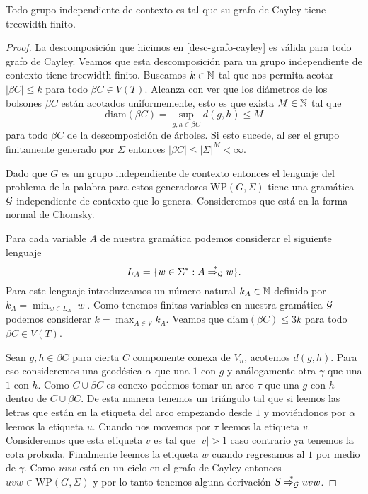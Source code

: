 \documentclass[tesis.tex]{subfiles}
\newcommand{\WP}{\text{WP}(G, \Sigma)}
\newcommand{\deriva}{\overset{*}{\Rightarrow_{\cal G}}}
\begin{document}
\medskip
\begin{teo}
	Todo grupo independiente de contexto es tal que su grafo de Cayley tiene treewidth finito.
\end{teo}
\begin{proof}

La descomposición que hicimos en \ref{desc-grafo-cayley} es válida para todo grafo de Cayley. 
Veamos que esta descomposición para un grupo independiente de contexto tiene treewidth finito. 
Buscamos $k \in \mathbb N$ tal que nos permita acotar $|\beta C| \le k$ para todo $\beta C \in V(T)$. 
Alcanza con ver que los diámetros de los bolsones $\beta C$ están acotados uniformemente, esto es que exista $M \in \mathbb N$ tal que 
\[
\text{diam}(\beta C) =  \sup_{g,h \in \beta C} d(g,h) \le M
\] 
para todo $\beta C$ de la descomposición de árboles.
Si esto sucede, al ser el grupo finitamente generado por $\Sigma$ entonces $|\beta C| \le |\Sigma|^{M} < \infty$.


Dado que $G$ es un grupo independiente de contexto entonces el lenguaje del problema de la palabra para estos generadores $\WP$ tiene una gramática $\cal G$ independiente de contexto que lo genera. 
Consideremos que está en la forma normal de Chomsky.

Para cada variable $A$ de nuestra gramática podemos considerar el siguiente lenguaje
\[
L_A = \{ w \in \Sigma^* : A \deriva w  \}.
\]
Para este lenguaje introduzcamos un número natural $k_A \in \mathbb N$ definido por $k_A = \min_{w \in L_A} |w|$. 
Como tenemos finitas variables en nuestra gramática $\cal G$ podemos considerar $k = \max_{A \in V} k_A$. 
Veamos que $\text{diam}(\beta C) \le 3k$ para todo $\beta C \in V(T)$.

Sean $g,h \in \beta C$ para cierta $C$ componente conexa de $V_n$, acotemos $d(g,h)$. 
Para eso consideremos una geodésica $\alpha$ que una $1$ con $g$ y análogamente otra $\gamma$ que una $1$ con $h$. 
Como $C \cup \beta C$ es conexo podemos tomar un arco $\tau$ que una $g$ con  $h$ dentro de $C \cup \beta C$. 
De esta manera tenemos un triángulo tal que si leemos las letras que están en la etiqueta del arco empezando desde $1$ y moviéndonos por $\alpha$ leemos la etiqueta $u$. 
Cuando nos movemos por $\tau$ leemos la etiqueta $v$. Consideremos que esta etiqueta $v$ es tal que $|v|>1$ caso contrario ya tenemos la cota probada. Finalmente leemos la etiqueta $w$ cuando regresamos al $1$ por medio de $\gamma$.
Como $uvw$ está en un ciclo en el grafo de Cayley entonces $uvw \in  \WP$ y por lo tanto tenemos alguna derivación $S \deriva uvw$.


\end{proof}
\end{document}
